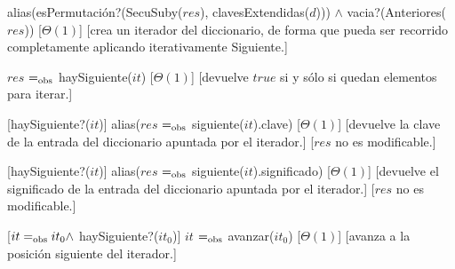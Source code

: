 \begin{Interfaz}
  {alias(esPermutación?(SecuSuby($res$), clavesExtendidas($d$))) $\land$ vacia?(Anteriores($res$))}
  [$\Theta(1)$]
  [crea un iterador del diccionario, de forma que pueda ser recorrido completamente aplicando iterativamente Siguiente.]
  
  {$res$ $=_{\mathrm{obs}}$ haySiguiente($it$)}
  [$\Theta(1)$]
  [devuelve $true$ si y sólo si quedan elementos para iterar.]  

  [haySiguiente?($it$)]  
  {alias($res$ $=_{\mathrm{obs}}$ siguiente($it$).clave)}
  [$\Theta(1)$]
  [devuelve la clave de la entrada del diccionario apuntada por el iterador.]  
  [$res$ no es modificable.]
  
  [haySiguiente?($it$)]  
  {alias($res$ $=_{\mathrm{obs}}$ siguiente($it$).significado)}
  [$\Theta(1)$]
  [devuelve el significado de la entrada del diccionario apuntada por el iterador.]  
  [$res$ no es modificable.]  
  
  [$it =_{\mathrm{obs}} it_0 \land$ haySiguiente?($it_0$)]  
  {$it$ $=_{\mathrm{obs}}$ avanzar($it_0$)}
  [$\Theta(1)$]
  [avanza a la posición siguiente del iterador.] 
  
\end{Interfaz}
